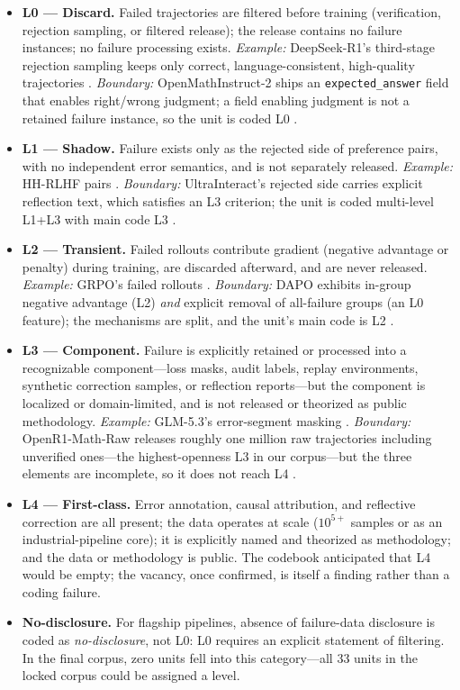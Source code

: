 \documentclass[10pt]{article}
\newcommand{\level}[1]{\textbf{#1}}
\begin{document}
\begin{itemize}
\item \level{L0 --- Discard.} Failed trajectories are filtered before training (verification, rejection sampling, or filtered release); the release contains no failure instances; no failure processing exists. \emph{Example:} DeepSeek-R1's third-stage rejection sampling keeps only correct, language-consistent, high-quality trajectories \cite{deepseek2025r1}. \emph{Boundary:} OpenMathInstruct-2 ships an \texttt{expected\_answer} field that enables right/wrong judgment; a field enabling judgment is not a retained failure instance, so the unit is coded L0 \cite{nvidia2024omi2}.
\item \level{L1 --- Shadow.} Failure exists only as the rejected side of preference pairs, with no independent error semantics, and is not separately released. \emph{Example:} HH-RLHF pairs \cite{anthropic2022hhrlhf}. \emph{Boundary:} UltraInteract's rejected side carries explicit reflection text, which satisfies an L3 criterion; the unit is coded multi-level L1+L3 with main code L3 \cite{yuan2024ultrainteract}.
\item \level{L2 --- Transient.} Failed rollouts contribute gradient (negative advantage or penalty) during training, are discarded afterward, and are never released. \emph{Example:} GRPO's failed rollouts \cite{deepseek2025r1}. \emph{Boundary:} DAPO exhibits in-group negative advantage (L2) \emph{and} explicit removal of all-failure groups (an L0 feature); the mechanisms are split, and the unit's main code is L2 \cite{yu2025dapo}.
\item \level{L3 --- Component.} Failure is explicitly retained or processed into a recognizable component---loss masks, audit labels, replay environments, synthetic correction samples, or reflection reports---but the component is localized or domain-limited, and is not released or theorized as public methodology. \emph{Example:} GLM-5.3's error-segment masking \cite{zai2026glm5}. \emph{Boundary:} OpenR1-Math-Raw releases roughly one million raw trajectories including unverified ones---the highest-openness L3 in our corpus---but the three elements are incomplete, so it does not reach L4 \cite{openr12025mathraw}.
\item \level{L4 --- First-class.} Error annotation, causal attribution, and reflective correction are all present; the data operates at scale ($10^{5+}$ samples or as an industrial-pipeline core); it is explicitly named and theorized as methodology; and the data or methodology is public. The codebook anticipated that L4 would be empty; the vacancy, once confirmed, is itself a finding rather than a coding failure.
\item \level{No-disclosure.} For flagship pipelines, absence of failure-data disclosure is coded as \emph{no-disclosure}, not L0: L0 requires an explicit statement of filtering. In the final corpus, zero units fell into this category---all 33 units in the locked corpus could be assigned a level.
\end{itemize}
\end{document}
